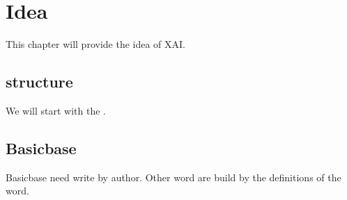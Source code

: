 \chapter{Idea}

This chapter will provide the idea of XAI.

\section{structure} %
We will start with the .


\section{Basicbase}
Basicbase need write by author. Other word are build by the definitions of the word.




